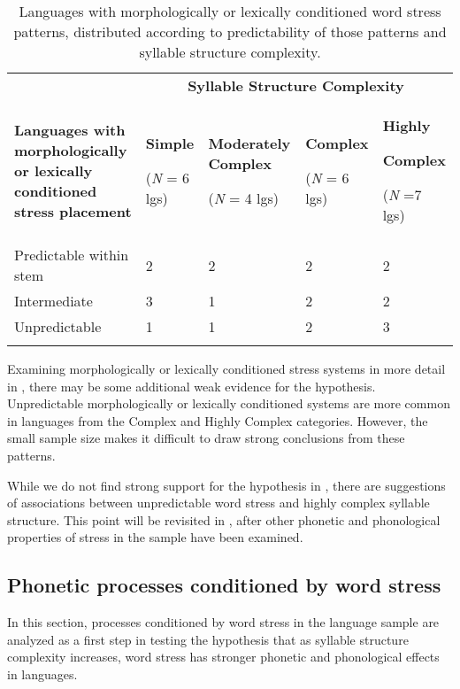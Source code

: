 \begin{table}
\begin{tabularx}{\textwidth}{XXXXX}
\lsptoprule
 & \multicolumn{4}{c}{ \textbf{Syllable Structure Complexity}}\\
 \textbf{Languages with morphologically or lexically conditioned stress placement} & { \textbf{Simple}}

 (\textit{N} = 6 lgs) & { \textbf{Moderately Complex}}

 (\textit{N} = 4 lgs) & { \textbf{Complex}}

 (\textit{N} = 6 lgs) & { \textbf{Highly} }

{ \textbf{Complex}}

 (\textit{N} =7 lgs)\\
 Predictable within stem & 2 & 2 & 2 & 2\\
 Intermediate & 3 & 1 & 2 & 2\\
 Unpredictable & 1 & 1 & 2 & 3\\
\lspbottomrule
\end{tabularx}
\caption{\label{tab:5.5}Languages with morphologically or lexically conditioned word stress patterns, distributed according to predictability of those patterns and syllable structure complexity.}
\end{table}

  Examining morphologically or lexically conditioned stress systems in more detail in , there may be some additional weak evidence for the hypothesis. Unpredictable morphologically or lexically conditioned systems are more common in languages from the Complex and Highly Complex categories. However, the small sample size makes it difficult to draw strong conclusions from these patterns.

  While we do not find strong support for the hypothesis in , there are suggestions of associations between unpredictable word stress and highly complex syllable structure. This point will be revisited in , after other phonetic and phonological properties of stress in the sample have been examined.

\subsection{Phonetic processes conditioned by word stress}\label{sec:5.4.3}

  In this section, processes conditioned by word stress in the language sample are analyzed as a first step in testing the hypothesis that as syllable structure complexity increases, word stress has stronger phonetic and phonological effects in languages.

